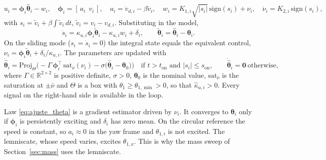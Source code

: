 \begin{equation}\label{eq:AccionControl}
u_i = \boldsymbol{\phi}_i\hat{\boldsymbol{\theta}}_i - w_i,\quad
\boldsymbol{\phi}_i = [\,a_i\ \ v_i\,],\quad a_i=\dot v_{d,i}-\beta\tilde v_i,\quad
w_i = K_{1,i}\sqrt{|s_i|}\,\mathrm{sign}(s_i)+\nu_i,\quad \dot\nu_i = K_{2,i}\,\mathrm{sign}(s_i),
\end{equation}
with $s_i=\tilde v_i+\beta\int\tilde v_i\,dt$, $\tilde v_i=v_i-v_{d,i}$. Substituting in the model,
\begin{equation}\label{eq:sdot_theta}
\dot s_i = \kappa_{u,i}\boldsymbol{\phi}_i\tilde{\boldsymbol{\theta}}_i - \kappa_{u,i}w_i + \delta_i,
\qquad \tilde{\boldsymbol{\theta}}_i=\hat{\boldsymbol{\theta}}_i-\boldsymbol{\theta}_i .
\end{equation}
On the sliding mode ($s_i=\dot s_i=0$) the integral state equals the equivalent control,
$\nu_i=\boldsymbol{\phi}_i\tilde{\boldsymbol{\theta}}_i+\delta_i/\kappa_{u,i}$. The parameters are updated with
\begin{equation}\label{eq:ajuste_theta}
\dot{\hat{\boldsymbol{\theta}}}_i=\mathrm{Proj}_{\Theta}\!\Big(-\Gamma\,\boldsymbol{\phi}_i^{\top}\,
\mathrm{sat}_{\bar\nu}(\nu_i)-\sigma\big(\hat{\boldsymbol{\theta}}_i-\boldsymbol{\theta}_0\big)\Big)
\quad\text{if } t>t_{\mathrm{on}}\text{ and }|s_i|\le s_{\mathrm{on}},\qquad
\dot{\hat{\boldsymbol{\theta}}}_i=\mathbf{0}\ \text{otherwise},
\end{equation}
where $\Gamma\in\mathbb{R}^{2\times2}$ is positive definite, $\sigma>0$, $\boldsymbol{\theta}_0$ is the
nominal value, $\mathrm{sat}_{\bar\nu}$ is the saturation at $\pm\bar\nu$ and $\Theta$ is a box with
$\theta_{1}\ge\theta_{1,\min}>0$, so that $\hat\kappa_{u,i}>0$. Every signal on the right-hand side is
available in the loop.

\begin{remark}[Identifiability]\label{rem:ident}
Law \eqref{eq:ajuste_theta} is a gradient estimator driven by $\nu_i$. It converges to
$\boldsymbol{\theta}_i$ only if $\boldsymbol{\phi}_i$ is persistently exciting and $\delta_i$ has zero
mean. On the circular reference the speed is constant, so $a_i\approx0$ in the yaw frame and
$\theta_{1,i}$ is not excited. The lemniscate, whose speed varies, excites $\theta_{1,x}$. This is why
the mass sweep of Section~\ref{sec:mass} uses the lemniscate.
\end{remark}

